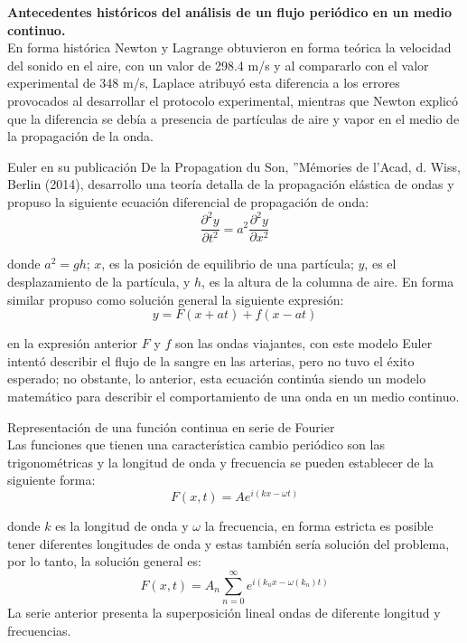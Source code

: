 \documentclass[letterpaper]{report}
\begin{document}
\begin{mdframed}[backgroundcolor=azulpastel]
\textbf{Antecedentes históricos del análisis de un flujo periódico en un medio continuo.}\\
En forma histórica Newton y Lagrange obtuvieron en forma teórica la velocidad del sonido en el aire, con un valor de 298.4 m/s y al compararlo con el valor
 experimental de 348 m/s, Laplace atribuyó esta diferencia a los errores provocados al desarrollar el protocolo experimental, mientras que Newton explicó 
que la diferencia se debía a presencia de partículas de aire y vapor en el medio de la propagación de la onda.\bigskip

Euler en su publicación De la Propagation du Son, ''Mémories de l’Acad, d. Wiss, Berlin (2014), desarrollo una teoría detalla de la propagación elástica de 
ondas y propuso la siguiente ecuación diferencial de propagación de onda:
\begin{equation}
	\frac{\partial^2 y}{\partial t^2}= a^2 \frac{\partial^2 y}{\partial x^2}
\end{equation}

donde $a^2=gh$; $x$, es la posición de equilibrio de una partícula; $y$, es el desplazamiento de la partícula, y $h$, es la altura de la columna de aire. En forma 
similar propuso como solución general la siguiente expresión:
\begin{equation}
	y = F(x+at) + f(x-at)
\end{equation} 

en la expresión anterior $F$ y $f$ son las ondas viajantes, con este modelo Euler intentó describir el flujo de la sangre en las arterias, pero no tuvo el éxito esperado; 
no obstante, lo anterior, esta ecuación continúa siendo un modelo matemático para describir el comportamiento de una onda en un medio continuo.
\begin{mdframed}[backgroundcolor=verdeclaro]
Representación de una función continua en serie de Fourier\\
Las funciones que tienen una característica cambio periódico son las trigonométricas y la longitud de onda y frecuencia se pueden establecer de la siguiente forma:
\begin{equation*}
F(x, t) = Ae^{i(kx-\omega t)}
\end{equation*}

donde $k$ es la longitud de onda y $\omega$ la frecuencia, en forma estricta es posible tener diferentes longitudes de onda y estas también sería solución del problema, 
por lo tanto, la solución general es:
\begin{equation*}
F(x, t) = A_n \sum_{n=0}^\infty e^{i(k_nx-\omega(k_n)t)}
\end{equation*}
La serie anterior presenta la superposición lineal ondas de diferente longitud y frecuencias.\bigskip


\end{mdframed}
\end{mdframed}
\end{document}
